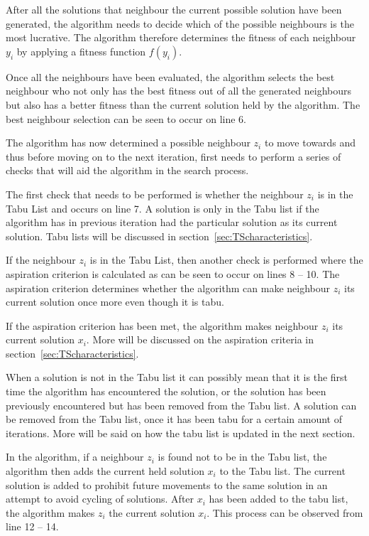 After all the solutions that neighbour the current possible solution have been generated, the algorithm needs to decide which of the possible neighbours is the most lucrative. The algorithm therefore determines the fitness of each neighbour $y_i$ by applying a fitness function $f(y_i)$. 

Once all the neighbours have been evaluated, the algorithm selects the best neighbour who not only has the best fitness out of all the generated neighbours but also has a better fitness than the current solution held by the algorithm. The best neighbour selection can be seen to occur on line 6.

The algorithm has now determined a possible neighbour $z_i$ to move towards and thus before moving on to the next iteration, first needs to perform a series of checks that will aid the algorithm in the search process.

The first check that needs to be performed is whether the neighbour $z_i$ is in the Tabu List and occurs on line 7. A solution is only in the Tabu list if the algorithm has in previous iteration had the particular solution as its current solution. Tabu lists will be discussed in section~\ref{sec:TScharacteristics}.

If the neighbour $z_i$ is in the Tabu List, then another check is performed where the aspiration criterion is calculated as can be seen to occur on lines 8 -- 10. The aspiration criterion determines whether the algorithm can make neighbour $z_i$ its current solution once more even though it is tabu. 

If the aspiration criterion has been met, the algorithm makes neighbour $z_i$ its current solution $x_i$. More will be discussed on the aspiration criteria in section~\ref{sec:TScharacteristics}.

When a solution is not in the Tabu list it can possibly mean that it is the first time the algorithm has encountered the solution, or the solution has been previously encountered but has been removed from the Tabu list. A solution can be removed from the Tabu list, once it has been tabu for a certain amount of iterations. More will be said on how the tabu list is updated in the next section.

In the algorithm, if a neighbour $z_i$ is found not to be in the Tabu list, the algorithm then adds the current held solution $x_i$ to the Tabu list. The current solution is added to prohibit future movements to the same solution in an attempt to avoid cycling of solutions. After $x_i$ has been added to the tabu list, the algorithm makes $z_i$ the current solution $x_i$. This process can be observed from line 12 -- 14.

